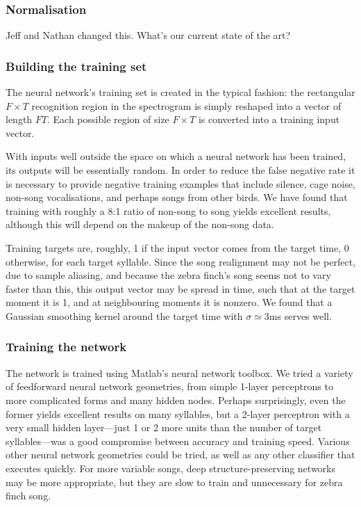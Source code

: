 \documentclass{article}
\let\oldmarginpar\marginpar
\renewcommand\marginpar[1]{\-\oldmarginpar[\raggedleft\footnotesize #1]
  {\raggedright\footnotesize #1}}
\begin{document}
\subsubsection{Normalisation}
Jeff and Nathan changed this. What's our current state of the art?\marginpar{FIXME}

\subsubsection{Building the training set}

The neural network's training set is created in the typical fashion:
the rectangular $F\times T$ recognition region in the spectrogram is
simply reshaped into a vector of length $FT$. Each possible region of
size $F\times T$ is converted into a training input vector.

With inputs well outside the space on which a neural network has been
trained, its outputs will be essentially random. In order to reduce
the false negative rate it is necessary to provide negative training
examples that include silence, cage noise, non-song vocalisations, and
perhaps songs from other birds. We have found that training with
roughly a 8:1 ratio of non-song to song yields excellent results,
although this will depend on the makeup of the non-song data.

Training targets are, roughly, 1 if the input vector comes from the
target time, 0 otherwise, for each target syllable. Since the song
realignment may not be perfect, due to sample aliasing, and because
the zebra finch's song seems not to vary faster than this, this output
vector may be spread in time, such that at the target moment it is 1,
and at neighbouring moments it is nonzero. We found that a Gaussian
smoothing kernel around the target time with $\sigma\simeq 3$ms serves
well.

\subsubsection{Training the network}

The network is trained using Matlab's neural network toolbox. We tried
a variety of feedforward neural network geometries, from simple
1-layer perceptrons to more complicated forms and many hidden
nodes. Perhaps surprisingly, even the former yields excellent results
on many syllables, but a 2-layer perceptron with a very small hidden
layer---just 1 or 2 more units than the number of target
syllables---was a good compromise between accuracy and training
speed. Various other neural network geometries could be tried, as well
as any other classifier that executes quickly.  For more variable
songs, deep structure-preserving networks may be more appropriate, but
they are slow to train and unnecessary for zebra finch song.
\end{document}
